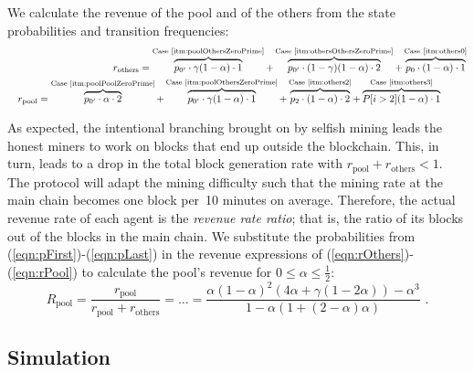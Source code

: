 \documentclass[letterpaper]{llncs}
\begin{document}
We calculate the revenue of the pool and of the others from the state probabilities and transition frequencies: 
\begin{eqnarray} 
&& r_{\text{others}} = 
        \overbrace{p_{0'} \cdot \gamma (1 - \alpha) \cdot 1}^{\text{Case~\ref{itm:poolOthersZeroPrime}}} + 
        \overbrace{p_{0'} \cdot (1 - \gamma) (1 - \alpha) \cdot 2}^{\text{Case~\ref{itm:othersOthersZeroPrime}}} + 
        \overbrace{p_0 \cdot (1 - \alpha) \cdot 1}^{\text{Case~\ref{itm:others0}}} \label{eqn:rOthers} \\
&& r_{\text{pool}} = 
        \overbrace{p_{0'} \cdot \alpha \cdot 2}^{\text{Case~\ref{itm:poolPoolZeroPrime}}} + 
        \overbrace{p_{0'} \cdot \gamma (1 - \alpha) \cdot 1}^{\text{Case~\ref{itm:poolOthersZeroPrime}}} + 
        \overbrace{p_2 \cdot (1 - \alpha) \cdot 2}^{\text{Case~\ref{itm:others2}}} + 
        \overbrace{P[i > 2] (1 - \alpha) \cdot 1}^{\text{Case~\ref{itm:others3}}} \label{eqn:rPool} \,\,\,\,\,\,\,\,\,\,\,\,\,\,\,\,
\end{eqnarray} 

\newcommand{\RPool}{\ensuremath{ R_{\text{pool}} }}

As expected, the intentional branching brought on by selfish mining leads the honest miners to work on blocks that end up outside the blockchain. This, in turn, leads to a drop in the total block generation rate with $r_{\text{pool}} + r_{\text{others}} < 1$. The protocol will adapt the mining difficulty such that the mining rate at the main chain becomes one block per~10 minutes on average. Therefore, the actual revenue rate of each agent is the \emph{revenue rate ratio}; that is, the ratio of its blocks out of the blocks in the main chain. We substitute the probabilities from (\ref{eqn:pFirst})-(\ref{eqn:pLast}) in the revenue expressions of (\ref{eqn:rOthers})-(\ref{eqn:rPool}) to calculate the pool's revenue for $0 \le \alpha \le \frac{1}{2}$: 
\begin{equation} 
\RPool = 
\frac{r_{\text{pool}}}{r_{\text{pool}} + r_{\text{others}}} = \dots = 
\frac{\alpha (1-\alpha)^2 (4\alpha + \gamma (1 - 2 \alpha)) - \alpha^3}
{1 - \alpha (1 + (2 - \alpha) \alpha)} \,\, . 
\label{eqn:revenue}
\end{equation} 

        \subsection{Simulation} 
        
\end{document}

